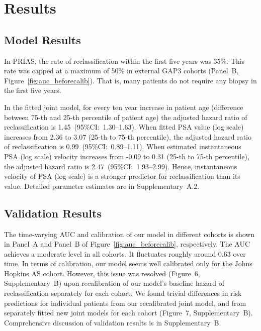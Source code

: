 \section{Results}
\subsection{Model Results}
In PRIAS, the rate of reclassification within the first five years was 35\%. This rate was capped at a maximum of 50\% in external GAP3 cohorts (Panel~B, Figure~\ref{fig:auc_beforecalib}). That is, many patients do not require any biopsy in the first five years. 

In the fitted joint model, for every ten year increase in patient age (difference between 75-th and 25-th percentile of patient age) the adjusted hazard ratio of reclassification is 1.45~(95\%CI:~1.30--1.63). When fitted PSA value (log scale) increases from 2.36 to 3.07 (25-th to 75-th percentile), the adjusted hazard ratio of reclassification is 0.99~(95\%CI:~0.89--1.11). When estimated instantaneous PSA (log scale) velocity increases from -0.09 to 0.31 (25-th to 75-th percentile), the adjusted hazard ratio is 2.47~(95\%CI:~1.93--2.99). Hence, instantaneous velocity of PSA (log scale) is a stronger predictor for reclassification than its value. Detailed parameter estimates are in Supplementary~A.2.

\subsection{Validation Results}
The time-varying AUC and calibration of our model in different cohorts is shown in Panel~A and Panel~B of Figure~\ref{fig:auc_beforecalib}, respectively. The AUC achieves a moderate level in all cohorts. It fluctuates roughly around 0.63 over time. In terms of calibration, our model seems well calibrated only for the Johns Hopkins AS cohort. However, this issue was resolved (Figure~6, Supplementary~B) upon recalibration of our model's baseline hazard of reclassification separately for each cohort. We found trivial differences in risk predictions for individual patients from our recalibrated joint model, and from separately fitted new joint models for each cohort (Figure~7, Supplementary~B). Comprehensive discussion of validation results is in Supplementary~B.

